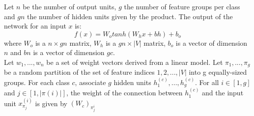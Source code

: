 \documentclass [a4paper, 11pt, oneside, final]{article}
\numberwithin{equation}{section}		%
\numberwithin{figure}{section}			%
\numberwithin{table}{section}				%
\begin{document}
Let $n$ be the number of output units, $g$ the number of feature groups per class and $gn$ the number of hidden units given by the product.
The output of the network for an input $x$ is:
$$ f(x) = W_{o}tanh(W_{h}x + bh) + b_{o}$$ where $W_{o}$ is a $n \times gn$ matrix, $W_{h}$ is a $gn \times |V|$ matrix, $b_{o}$ is a vector of dimension
$n$ and $bn$ is a vector of dimension $gc$.\\
Let ${w_{1}, . . . , w_{n}}$ be a set of weight vectors derived from a linear model. Let ${\pi_{1}, . . . , \pi_{g}}$ be a random partition of the set of feature indices ${1, 2, . . . , |V |}$  into g equally-sized groups. For each class $c$, associate $g$ hidden units ${h_{1}^{(c)}, . . . , h_{g}^{(c)}}$.
 For all $i \in [1, g]$ and $j \in [1, |\pi(i) |]$, the weight of the connection between $h_{1}^{(c)}$ and the input unit $x_{\pi_{j}}^{(i)} $ is given by $(W_{c})_{\pi_{j}^{i}}$
	
\end{document}
